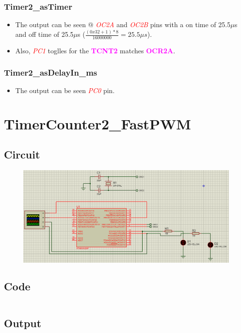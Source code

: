 \documentclass[oneside]{book}
\newcommand{\pinFormat}[1]{\emph{\textcolor{red}{#1}}}
\newcommand{\regFormat}[1]{\textbf{\textcolor{magenta}{#1}}}
\begin{document}
\subsubsection{Timer2\_asTimer}
\begin{itemize}
    \item The output can be seen @ \pinFormat{OC2A} and \pinFormat{OC2B} pins with a on time of 25.5$\mu$s and off time of 25.5$\mu$s ($\frac{(0x32+1) * 8}{16000000} = 25.5\mu s$).
    \item Also, \pinFormat{PC1} toglles for the \regFormat{TCNT2} matches \regFormat{OCR2A}.
\end{itemize}
\subsubsection{Timer2\_asDelayIn\_ms}
\begin{itemize}
    \item The output can be seen \pinFormat{PC0} pin.
\end{itemize}


\section{TimerCounter2\_FastPWM}
\subsection{Circuit}
\begin{figure}[H]
    \centering
    \includegraphics[height=0.2\textheight]{TimerCounter2_FastPWM.png}
\end{figure}
\subsection{Code}
\inputminted[breaklines, bgcolor=black]{c}{../programFiles/TimerCounter2_FastPWM.c}
\subsection{Output}
\end{document}
